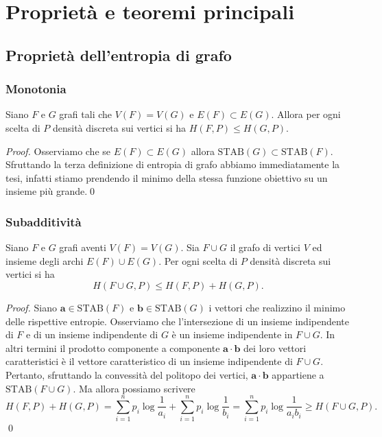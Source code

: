 \chapter{Proprietà e teoremi principali} 
\section{Proprietà dell'entropia di grafo} 
\subsection{Monotonia} 
\begin{lemma}
	Siano \(F\) e \(G\) grafi tali che \(V(F)=V(G)\) e \(E(F)\subset E(G)\). Allora per ogni scelta di \(P\) densità discreta sui vertici si ha \(H(F,P)\le H(G,P)\). 
\end{lemma}
\begin{proof}
	Osserviamo che se \(E(F)\subset E(G)\) allora \(\text{STAB}(G)\subset \text{STAB}(F)\). Sfruttando la terza definizione di entropia di grafo abbiamo immediatamente la tesi, infatti stiamo prendendo il minimo della stessa funzione obiettivo su un insieme più grande.\qed 
\end{proof}

\subsection{Subadditività} 
\begin{lemma}
	Siano \(F\) e \(G\) grafi aventi \(V(F) = V(G)\). Sia \(F\cup G\) il grafo di vertici \(V\) ed insieme degli archi \(E(F)\cup E(G)\). Per ogni scelta di \(P\) densità discreta sui vertici si ha
	\[H(F\cup G,P)\le H(F,P)+H(G,P).\]
\end{lemma}
\begin{proof}
	Siano \(\mathbf{a}\in \text{STAB}(F)\) e \(\mathbf{b}\in \text{STAB}(G)\) i vettori che realizzino il minimo delle rispettive entropie. Osserviamo che l'intersezione di un insieme indipendente di \(F\) e di un insieme indipendente di \(G\) è un insieme indipendente in \(F\cup G\). In altri termini il prodotto componente a componente \(\mathbf{a}\cdot \mathbf{b}\) dei loro vettori caratteristici è il vettore caratteristico di un insieme indipendente di \(F\cup G\). Pertanto, sfruttando la convessità del politopo dei vertici, \(\mathbf{a}\cdot \mathbf{b}\) appartiene a \(\text{STAB}(F\cup G)\). Ma allora possiamo scrivere
	\[H(F,P)+H(G,P)=\sum_{i=1}^n p_i\log{\frac{1}{a_i}}+\sum_{i=1}^n p_i\log{\frac{1}{b_i}}=\sum_{i=1}^n p_i\log{\frac{1}{a_{i}b_{i}}}\ge H(F\cup G,P).\]
	\qed 
\end{proof}

